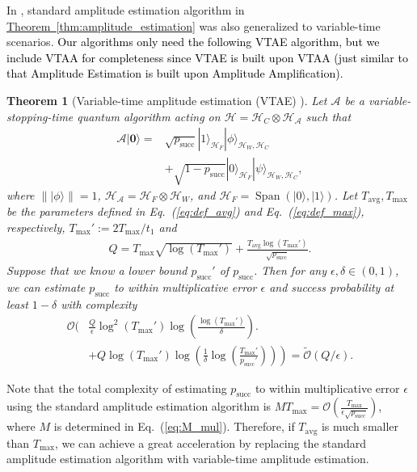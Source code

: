 \documentclass[journal]{IEEEtran}
\newtheorem{theorem}{Theorem}
\newcommand{\eq}[1]{Eq.~(\ref{eq:#1})}
\newcommand{\thm}[1]{\hyperref[thm:#1]{Theorem~\ref*{thm:#1}}}
\DeclareMathOperator{\spn}{Span}
\begin{document}
In \cite{chakraborty2019linear}, standard amplitude estimation algorithm in \thm{amplitude_estimation} was also generalized to variable-time scenarios. \textcolor{black}{Our algorithms only need the following VTAE algorithm, but we include VTAA for completeness since VTAE is built upon VTAA (just similar to that Amplitude Estimation is built upon Amplitude Amplification).}

\begin{theorem}[Variable-time amplitude estimation (VTAE) {\cite[Theorem 23]{chakraborty2019linear}}]
\label{thm:vtae}
  Let $\mathcal{A}$ be a variable-stopping-time quantum algorithm acting on $\mathcal{H} = \mathcal{H}_C\otimes \mathcal{H}_{\mathcal{A}} $ such that
    \begin{align}
        \mathcal{A}|\mathbf{0}\rangle=&\sqrt{p_{\mathrm{succ}}}|1\rangle_{\mathcal{H}_F}|\phi\rangle_{\mathcal{H}_W,\mathcal{H}_C}\nonumber \\ &+\sqrt{1-p_{\mathrm{succ}}}|0\rangle_{\mathcal{H}_F}|\psi\rangle_{\mathcal{H}_W,\mathcal{H}_C},
    \end{align}
    where $\||\phi\rangle \|=1$, $\mathcal{H}_{\mathcal{A}} = \mathcal{H}_{F}\otimes \mathcal{H}_{W}$, and $\mathcal{H}_F = \spn(|0\rangle,|1\rangle)$. Let $T_{\mathrm{avg}},T_{\max}$ be the parameters defined in \eq{def_avg} and \eq{def_max}, respectively,  $T_{\max}' := 2T_{\max}/t_1$ and
    \begin{align}
        Q = T_{\max}\sqrt{\log(T_{\max}')} + \frac{T_{\mathrm{avg}}\log(T_{\max}')}{\sqrt{p_{\mathrm{succ}}}}.
    \end{align}
    Suppose that we know a lower bound $p_{\mathrm{succ}}'$  of $p_{\mathrm{succ}}$. Then for any $\epsilon,\delta \in (0,1)$, we can estimate $p_{\mathrm{succ}}$ to within multiplicative error $\epsilon$ and success probability at least $1-\delta$ with complexity
    \begin{align}
        \mathcal{O}\biggl(&\frac{Q}{\epsilon}\log^2(T_{\max}')\log(\frac{\log(T_{\max}')}{\delta}) \nonumber \biggr. \\ &\left.+ Q\log(T_{\max}')\log(\frac{1}{\delta}\log(\frac{T_{\max}'}{p_{\mathrm{succ}}'}))\right) = \widetilde{\mathcal{O}}(Q/\epsilon).
    \end{align}
\end{theorem}

Note that the total complexity of estimating $p_{\mathrm{succ}}$ to within multiplicative error $\epsilon$ using the standard amplitude estimation algorithm is $MT_{\max} = \mathcal{O}(\frac{T_{\max}}{\epsilon\sqrt{p_{\mathrm{succ}}}})$, where $M$ is determined in \eq{M_mul}. Therefore, if $T_{\mathrm{avg}}$ is much smaller than $T_{\max}$, we can achieve a great acceleration by replacing the standard amplitude estimation algorithm with variable-time amplitude estimation.
\end{document}
